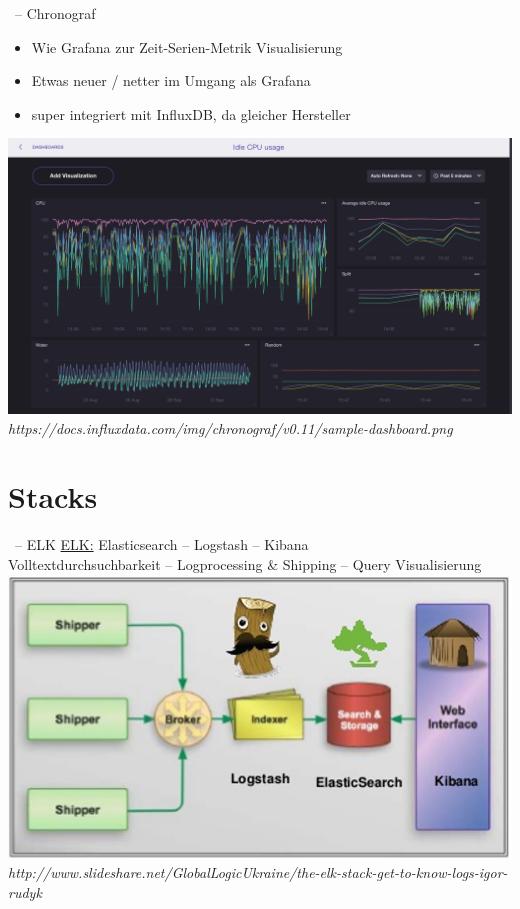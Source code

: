 \documentclass{beamer}
\begin{document}
\begin{frame}{\insertsection\ -- Chronograf}
	\begin{itemize}
		\item Wie Grafana zur Zeit-Serien-Metrik Visualisierung
		\item Etwas neuer / netter im Umgang als Grafana
		\item super integriert mit InfluxDB, da gleicher Hersteller
	\end{itemize}
	\includegraphics[width=0.8\linewidth,page=1]{img/chronograf.png}\\
	\fontsize{4pt}{7.2}\selectfont
	\textit{https://docs.influxdata.com/img/chronograf/v0.11/sample-dashboard.png}
\end{frame}

\section{Stacks}

\begin{frame}{\insertsection\ -- ELK}
	\underline{ELK:} Elasticsearch -- Logstash -- Kibana\\
	Volltextdurchsuchbarkeit -- Logprocessing \& Shipping -- Query Visualisierung
	\includegraphics[width=0.8\linewidth,page=1]{img/ELK-stack.jpg}\\
	\fontsize{4pt}{7.2}\selectfont
	\textit{http://www.slideshare.net/GlobalLogicUkraine/the-elk-stack-get-to-know-logs-igor-rudyk}
\end{frame}
\end{document}
